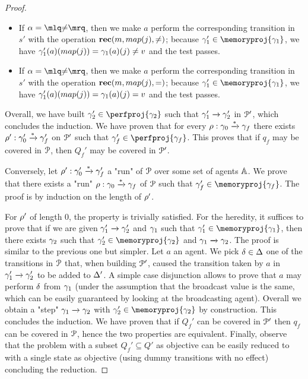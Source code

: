 \begin{proof}
\begin{itemize}
\begin{itemize}
		\item If $\anact = \quotemarks{\diseqtestact}$, then we make $a$ perform the corresponding transition in $s'$ with the operation $\rec{m}{\map(j)}{\diseqtestact}$; because $\config_1' \in \memoryproj{\config_1}$,  we have $\config_1'(a)(\map(j)) = \config_1(a)(j) \ne v$ and the test passes.
		\item If $\anact = \quotemarks{\diseqtestact}$, then we make $a$ perform the corresponding transition in $s'$ with the operation $\rec{m}{\map(j)}{\eqtestact}$; because $\config_1' \in \memoryproj{\config_1}$,  we have $\config_1'(a)(\map(j)) = \config_1(a)(j) = v$ and the test passes.	
		\end{itemize}
	\end{itemize}

	Overall, we have built $\config_2' \in \perfproj{\config_2}$ such that $\gamma_1' \xrightarrow{} \gamma_2'$ in $\mathcal{P}'$, which concludes the induction. We have proven that for every $\rho: \gamma_0 \xrightarrow{*} \gamma_f$ there exists $\rho': \gamma_0' \xrightarrow{*} \gamma_f'$ on $\mathcal{P}'$ such that $\config_f' \in \perfproj{\config_f}$. This proves that if $q_f$ may be covered in $\mathcal{P}$, then $Q_f'$ may be covered in $\mathcal{P}'$. 

	Conversely, let $\rho' : \gamma_0' \xrightarrow{*} \gamma_f'$ a "run" of $\mathcal{P}$ over some set of agents $\mathbb{A}$. We prove that there exists a "run" $\rho: \gamma_0 \xrightarrow{*} \gamma_f$ of $\mathcal{P}$ such that $\config_f' \in \memoryproj{\config_f}$. The proof is by induction on the length of $\rho'$. 

	For $\rho'$ of length $0$, the property is trivially satisfied. For the heredity, it suffices to prove that if we are given $\gamma_1' \xrightarrow{} \gamma_2'$ and $\gamma_1$ such that $\config_1' \in \memoryproj{\config_1}$, then there exists $\gamma_2$ such that $\config_2' \in \memoryproj{\config_2}$ and $\gamma_1 \xrightarrow{} \gamma_2$. The proof is similar to the previous one but simpler. Let $a$ an agent. We pick $\delta \in \Delta$ one of the transitions in $\mathcal{P}$ that, when building $\mathcal{P}'$, caused the transition taken by $a$ in $\gamma_1' \xrightarrow{} \gamma_2'$ to be added to $\Delta'$. A simple case disjunction allows to prove that $a$ may perform $\delta$ from $\gamma_1$ (under the assumption that the broadcast value is the same, which can be easily guaranteed by looking at the broadcasting agent). Overall we obtain a "step" $\gamma_1 \xrightarrow{} \gamma_2$ with $\config_2' \in \memoryproj{\config_2}$ by construction. This concludes the induction. We have proven that if $Q_f'$ can be covered in $\mathcal{P}'$ then $q_f$ can be covered in $\mathcal{P}$, hence the two properties are equivalent.
	Finally, observe that the \COVER problem with a subset $Q_f' \subseteq Q'$ as objective can be easily reduced to \COVER with a single state as objective (using dummy transitions with no effect) concluding the reduction.
\end{proof}
